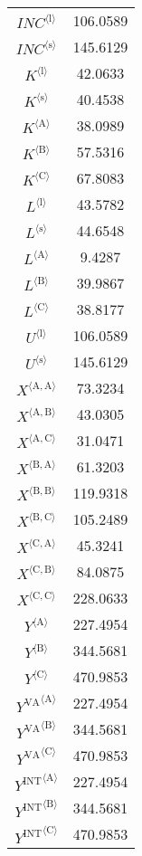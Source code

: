 \begin{tabular}{c|c|}
${{I\!N\!C}}^{\langle \mathrm{l}\rangle}$ & 106.0589 \\
${{I\!N\!C}}^{\langle \mathrm{s}\rangle}$ & 145.6129 \\
${K}^{\langle \mathrm{l}\rangle}$ & 42.0633 \\
${K}^{\langle \mathrm{s}\rangle}$ & 40.4538 \\
${K}^{\langle \mathrm{A}\rangle}$ & 38.0989 \\
${K}^{\langle \mathrm{B}\rangle}$ & 57.5316 \\
${K}^{\langle \mathrm{C}\rangle}$ & 67.8083 \\
${L}^{\langle \mathrm{l}\rangle}$ & 43.5782 \\
${L}^{\langle \mathrm{s}\rangle}$ & 44.6548 \\
${L}^{\langle \mathrm{A}\rangle}$ & 9.4287 \\
${L}^{\langle \mathrm{B}\rangle}$ & 39.9867 \\
${L}^{\langle \mathrm{C}\rangle}$ & 38.8177 \\
${U}^{\langle \mathrm{l}\rangle}$ & 106.0589 \\
${U}^{\langle \mathrm{s}\rangle}$ & 145.6129 \\
${X}^{\langle \mathrm{A},\mathrm{A}\rangle}$ & 73.3234 \\
${X}^{\langle \mathrm{A},\mathrm{B}\rangle}$ & 43.0305 \\
${X}^{\langle \mathrm{A},\mathrm{C}\rangle}$ & 31.0471 \\
${X}^{\langle \mathrm{B},\mathrm{A}\rangle}$ & 61.3203 \\
${X}^{\langle \mathrm{B},\mathrm{B}\rangle}$ & 119.9318 \\
${X}^{\langle \mathrm{B},\mathrm{C}\rangle}$ & 105.2489 \\
${X}^{\langle \mathrm{C},\mathrm{A}\rangle}$ & 45.3241 \\
${X}^{\langle \mathrm{C},\mathrm{B}\rangle}$ & 84.0875 \\
${X}^{\langle \mathrm{C},\mathrm{C}\rangle}$ & 228.0633 \\
${Y}^{\langle \mathrm{A}\rangle}$ & 227.4954 \\
${Y}^{\langle \mathrm{B}\rangle}$ & 344.5681 \\
${Y}^{\langle \mathrm{C}\rangle}$ & 470.9853 \\
${Y^{\mathrm{VA}}}^{\langle \mathrm{A}\rangle}$ & 227.4954 \\
${Y^{\mathrm{VA}}}^{\langle \mathrm{B}\rangle}$ & 344.5681 \\
${Y^{\mathrm{VA}}}^{\langle \mathrm{C}\rangle}$ & 470.9853 \\
${Y^{\mathrm{INT}}}^{\langle \mathrm{A}\rangle}$ & 227.4954 \\
${Y^{\mathrm{INT}}}^{\langle \mathrm{B}\rangle}$ & 344.5681 \\
${Y^{\mathrm{INT}}}^{\langle \mathrm{C}\rangle}$ & 470.9853 \\
\hline
\end{tabular}



